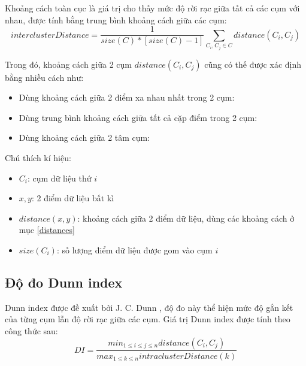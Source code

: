 	Khoảng cách toàn cục là giá trị cho thấy mức độ rời rạc giữa tất cả các cụm với nhau, được tính bằng trung bình khoảng cách giữa các cụm:
		\begin{equation}
			interclusterDistance = \frac{1}{size(C) * [size(C)-1]} \sum_{C_i, C_j \in C} distance(C_i, C_j)
		\end{equation}
	
	Trong đó, khoảng cách giữa 2 cụm $distance(C_i, C_j)$ cũng có thế được xác định bằng nhiều cách như:
		\begin{itemize}
			\item Dùng khoảng cách giữa 2 điểm xa nhau nhất trong 2 cụm:\\
			
			\item Dùng trung bình khoảng cách giữa tất cả cặp điểm trong 2 cụm:\\
			
			\item Dùng khoảng cách giữa 2 tâm cụm:\\
	\end{itemize}

	Chú thích kí hiệu: 
	\begin{itemize}
		\item $C_i$: cụm dữ liệu thứ $i$
		\item $x, y$: 2 điểm dữ liệu bất kì
		\item $distance(x, y)$: khoảng cách giữa 2 điểm dữ liệu, dùng các khoảng cách ở mục \ref{distances}
		\item $size(C_i)$: số lượng điểm dữ liệu được gom vào cụm $i$
	\end{itemize}
	\subsection{Độ đo Dunn index}
	Dunn index được đề xuất bởi J. C. Dunn \cite{dunn1973fuzzy2}, độ đo này thể hiện mức độ gắn kết của từng cụm lẫn độ rời rạc giữa các cụm. Giá trị Dunn index được tính theo công thức sau:	
		\begin{equation} \label{dunnindex}
		DI = \frac{min_{1 \leq i \leq j \leq n}distance(C_i, C_j)}{max_{1 \leq k \leq n}intraclusterDistance(k)}
		\end{equation}
		
